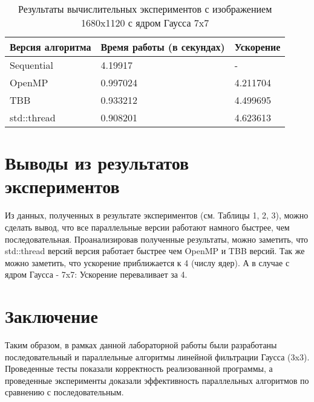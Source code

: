 \documentclass{report}
\begin{document}
\begin{table}[!h]
\caption{Результаты вычислительных экспериментов с изображением 1680x1120 с ядром Гаусса 7x7}
\centering
\begin{tabular}{| p{5cm} | p{5cm} | p{5cm} |}
\hline
Версия алгоритма & Время работы (в секундах) & Ускорение  \\[5pt]
\hline
Sequential        & 4.19917        & -         \\
OpenMP        & 0.997024        & 4.211704          \\
TBB       & 0.933212        & 4.499695         \\
std::thread        & 0.908201        & 4.623613           \\
\hline
\end{tabular}
\end{table}

\newpage

\section*{Выводы из результатов экспериментов}
Из данных, полученных в результате экспериментов (см. Таблицы 1, 2, 3), можно сделать вывод, что все параллельные версии работают намного быстрее, чем последовательная. Проанализировав полученные результаты, можно заметить, что std::thread версий версия работает быстрее чем OpenMP и TBB версий. Так же можно заметить, что ускорение приближается к 4 (числу ядер). А в случае с ядром Гаусса - 7x7: Ускорение переваливает за 4.
\newpage

\section*{Заключение}
Таким образом, в рамках данной лабораторной работы были разработаны последовательный и параллельные алгоритмы линейной фильтрации Гаусса (3x3). Проведенные тесты показали корректность реализованной программы, а проведенные эксперименты доказали эффективность параллельных алгоритмов по сравнению с последовательным.
\newpage

\end{document}
